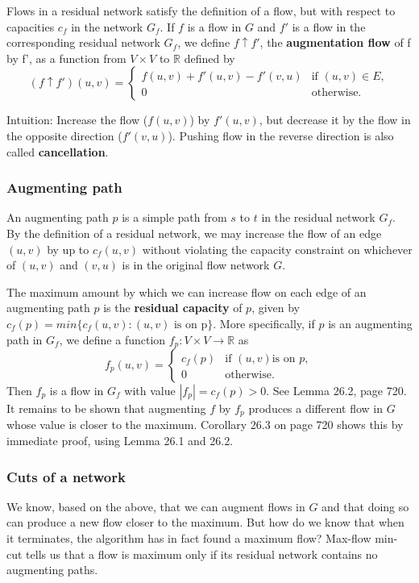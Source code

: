 Flows in a residual network satisfy the definition of a flow, but with respect to capacities
$c_f$ in the network $G_f$. If $f$ is a flow in $G$ and $f'$ is a flow in the corresponding residual
network $G_f$, we define $f \uparrow f'$, the \textbf{augmentation flow} of f by f', as a function
from $V \times V$ to $\mathbb{R}$ defined by
\[
  (f \uparrow f')(u,v) =
  \begin{cases}
  	f(u,v) + f'(u,v) - f'(v,u) & \text{if } (u,v) \in E, \\
  	0 & \text{otherwise.}
  \end{cases}
\]

Intuition: Increase the flow ($f(u,v)$) by $f'(u,v)$, but decrease it by the flow in the
opposite direction ($f'(v,u)$). Pushing flow in the reverse direction is also called \textbf{cancellation}.

\subsubsection{Augmenting path}
An augmenting path $p$ is a simple path from $s$ to $t$ in the residual network $G_f$. By the definition
of a residual network, we may increase the flow of an edge $(u,v)$ by up to $c_f(u,v)$ without violating the
capacity constraint on whichever of $(u,v)$ and $(v,u)$ is in the original flow network $G$.

The maximum amount by which we can increase flow on each edge of an augmenting path $p$ is the
\textbf{residual capacity} of $p$, given by $c_f(p) = min\{c_f(u,v) : (u,v) \text{ is on p}\}$. More specifically,
if $p$ is an augmenting path in $G_f$, we define a function $f_p : V \times V \rightarrow \mathbb{R}$ as
\[
	f_p(u,v) =
	\begin{cases}
		c_f(p) & \text{if } (u,v) \text{is on } p, \\
		0 & \text{otherwise}.
	\end{cases}
\]
Then $f_p$ is a flow in $G_f$ with value $|f_p| = c_f(p) > 0$. See Lemma 26.2, page 720. It remains to be
shown that augmenting $f$ by $f_p$ produces a different flow in $G$ whose value is closer to the maximum.
Corollary 26.3 on page 720 shows this by immediate proof, using Lemma 26.1 and 26.2.

\subsubsection{Cuts of a network}
We know, based on the above, that we can augment flows in $G$ and that doing
so can produce a new flow closer to the maximum. But how do we know that when
it terminates, the algorithm has in fact found a maximum flow? Max-flow min-
cut tells us that a flow is maximum only if its residual network contains no
augmenting paths.

